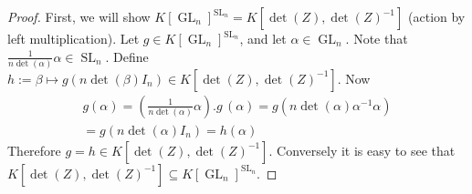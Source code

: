 \begin{proof}
  First, we will show $ K \left\lbrack \operatorname{GL}_n \right\rbrack ^{\operatorname{SL}_n} = K \left\lbrack \operatorname{det} (Z) , \operatorname{det} (Z) ^{-1} \right\rbrack $ (action by left multiplication).
  Let $g \in K \left\lbrack \operatorname{GL}_n \right\rbrack ^{ \operatorname{SL}_n }$, and let $ \alpha \in \operatorname{GL}_n $.
  Note that $ \frac{1}{n \operatorname{det} (\alpha)} \alpha \in \operatorname{SL}_n $.
  Define $ h := \beta \mapsto g \left( n \operatorname{det} (\beta) I_n \right) \in K \left\lbrack \operatorname{det} (Z) , \operatorname{det} (Z) ^{-1} \right\rbrack $.
  Now
  \begin{equation}
    \begin{aligned}
      g ( \alpha )
      = \left( \frac{1}{n \operatorname{det} (\alpha)} \alpha \right) . g \, (\alpha)
      = g \left( n \operatorname{det} (\alpha) \alpha ^{-1} \alpha \right) \\
      = g \left( n \operatorname{det} (\alpha) I_n \right)
      = h (\alpha)
    \end{aligned}
  \end{equation}
  Therefore $ g = h \in K \left\lbrack \operatorname{det} (Z) , \operatorname{det} (Z) ^{-1} \right\rbrack $.
  Conversely it is easy to see that $ K \left\lbrack \operatorname{det} (Z) , \operatorname{det} (Z) ^{-1} \right\rbrack \subseteq K \left\lbrack \operatorname{GL}_n \right\rbrack ^{\operatorname{SL}_n } $.
\end{proof}

